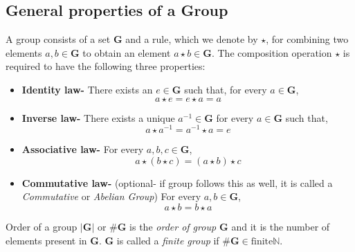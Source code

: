 	\begin{mdframed}
		\subsection{General properties of a Group}
			A group consists of a set $\mathbf{G}$ and a rule, which we denote by \(\star\), for combining two elements $a,b \in \mathbf{G}$ to obtain an element \(a\star b \in \mathbf{G}\). The composition operation \(\star\) is required to have the following three properties:
			\begin{itemize}
				\item \textbf{Identity law-} There exists an \(e \in \mathbf{G}\) such that, for every \(a \in \mathbf{G}\), \[a\star e = e \star a= a\]
				\item \textbf{Inverse law-} There exists a unique \(a^{-1} \in \mathbf{G}\) for every \(a \in \mathbf{G}\) such that, \[a \star a^{-1}= a^{-1} \star a = e\]
				\item \textbf{Associative law-} For every \(a, b, c \in \mathbf{G}\), \[a\star(b\star c )=(a\star b)\star c\]
				\item \textbf{Commutative law-} (optional- if group follows this as well, it is called a \emph{Commutative} or \emph{Abelian Group}) For every \(a, b \in \mathbf{G}\), \[a\star b = b \star a\] 
			\end{itemize}
			
			\begin{tcolorbox}
				Order of a group
				\tcblower
				\(|\mathbf{G}|\) or \(\# \mathbf{G}\) is the \emph{order of group \(\mathbf{G}\)} and it is the number of elements present in \(\mathbf{G}\). \(\mathbf{G}\) is called a \emph{finite group} if \(\# \mathbf{G} \in \text{finite} \mathbb{N}\). 
			\end{tcolorbox}


\end{mdframed}
